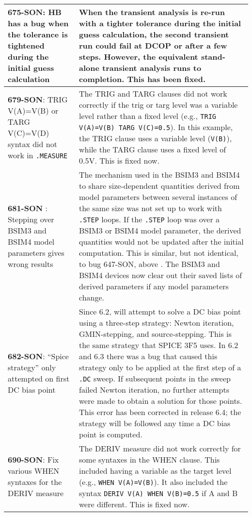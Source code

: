 {\begin{longtable}[h] {>{\raggedright\small}m{2in}|>{\raggedright\let\\\tabularnewline\small}m{3.5in}}
\textbf{675-SON}: HB has a bug when the tolerance is tightened during
the initial guess calculation &  
When the transient analysis is re-run with a tighter tolerance during
the initial guess calculation, the second transient run could fail at
DCOP or after a few steps. However, the equivalent stand-alone
transient analysis runs to completion. This has been fixed.
\\ \hline

     \textbf{679-SON}: TRIG V(A)=V(B) or TARG V(C)=V(D) syntax did not work in
     \texttt{.MEASURE} & The TRIG and TARG clauses did not work correctly if the trig or
     targ level was a variable level rather than a fixed level (e.g.,
     \texttt{TRIG V(A)=V(B) TARG V(C)=0.5}). In this example, the TRIG clause
     uses a variable level (\texttt{V(B)}), while the TARG clause uses a fixed
     level of 0.5V.  This is fixed now.  
     \\ \hline

     \textbf{681-SON }: Stepping over BSIM3 and BSIM4 model parameters gives
     wrong results  & The mechanism used in the BSIM3 and BSIM4 to share
     size-dependent quantities derived from model parameters between several
     instances of the same size was not set up to work with \texttt{.STEP}
     loops. If the \texttt{.STEP} loop was over a BSIM3 or BSIM4 model
     parameter, the derived quantities would not be updated after the initial
     computation.  This is similar, but not identical, to bug 647-SON, above .
     The BSIM3 and BSIM4 devices now clear out their saved lists of derived
     parameters if any model parameters change.
     \\ \hline

     \textbf{682-SON}: ``Spice strategy'' only attempted on first DC bias point
     & Since \Xyce{} 6.2, \Xyce{} will attempt to solve a DC bias point using a
     three-step strategy:  Newton iteration, GMIN-stepping, and
     source-stepping.  This is the same strategy that SPICE 3F5 uses.  In \Xyce{} 6.2 and
     \Xyce{} 6.3 there was a bug that caused this strategy only to be applied at
     the first step of a \texttt{.DC} sweep.  If subsequent points in the sweep
     failed Newton iteration, no further attempts were made to obtain a
     solution for those points.  This error has been corrected in release 6.4;
     the strategy will be followed any time a DC bias point is computed.  \\
     \hline

     \textbf{690-SON}: Fix various WHEN syntaxes for the DERIV measure &  The
     DERIV measure did not work correctly for some syntaxes in the WHEN clause.
     This included having a variable as the target level (e.g., \texttt{WHEN
     V(A)=V(B)}).  It also included the syntax \texttt{DERIV V(A) WHEN
     V(B)=0.5} if A and B were different.  This is fixed now.  
     \\ \hline 


\end{longtable}}
